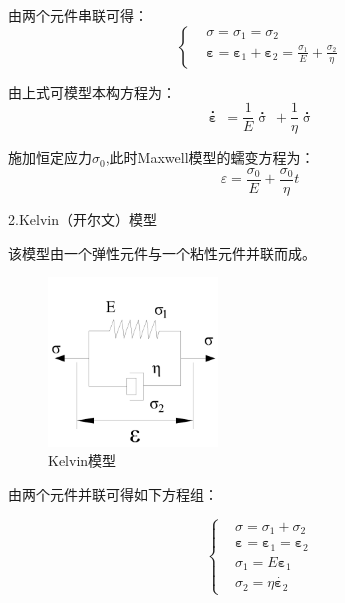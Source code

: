 由两个元件串联可得：
\begin{equation}
\left\{\begin{matrix}
          &\sigma ={{\sigma}_{1}}={{\sigma }_{2}}   \\
          &\boldsymbol{\varepsilon} ={{\boldsymbol{\varepsilon} }_{1}}+{{\boldsymbol{\varepsilon} }_{2}} 
         =\frac{{\sigma }_{1}}{E}+\frac{{\sigma }_{2}}{\eta}
        \end{matrix}  
 \right.
\end{equation}

由上式可模型本构方程为：
\begin{equation}
     \overset{\centerdot }{\mathop{\boldsymbol{\varepsilon} }}\,=\frac{1}{E}\overset{\centerdot }{\mathop{\sigma }}\,+\frac{1}{\eta }\overset{\centerdot }{\mathop{\sigma }}
\end{equation}

施加恒定应力$\sigma_0$,此时Maxwell模型的蠕变方程为：
\begin{equation}
     {\varepsilon}=\frac{\sigma_0}{E}+\frac{\sigma_0}{\eta }t
\end{equation}


2.Kelvin（开尔文）模型

该模型由一个弹性元件与一个粘性元件并联而成。
\begin{figure}[ht!]
    \centering
            \centering
            \includegraphics[width=0.4\textwidth]{img/chap3/Kelvin.png}
    \caption{Kelvin模型}
    \label{fig:3-6}
\end{figure}

由两个元件并联可得如下方程组：

\begin{equation}
  \left\{
  \begin{matrix}
 &\sigma =\sigma _1+\sigma _2  \\
 & \boldsymbol{\varepsilon} =\boldsymbol{\varepsilon}_1=\boldsymbol{\varepsilon}_2\\ 
 & \sigma _1=E \boldsymbol{\varepsilon}_1  \\
 & \sigma _2=\eta \dot{\boldsymbol{\varepsilon}_2}
 \end{matrix}
 \right.
\end{equation}

